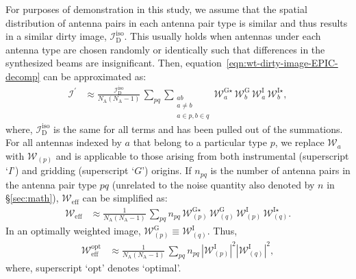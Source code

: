 \documentclass[a4paper,fleqn,usenatbib]{mnras}
\newcommand{\Nant}{N_\textrm{A}}
\begin{document}
For purposes of demonstration in this study, we assume that the spatial distribution of antenna pairs in each antenna pair type is similar and thus results in a similar dirty image, $\mathcal{I}_\textrm{D}^\textrm{iso}$. This usually holds when antennas under each antenna type are chosen randomly or identically such that differences in the synthesized beams are insignificant. Then, equation~\ref{eqn:wt-dirty-image-EPIC-decomp} can be approximated as:
\begin{align}\label{eqn:wt-dirty-image-EPIC-decomp-approx1}
  \mathcal{I}^\prime &\approx \frac{\mathcal{I}_\textrm{D}^\textrm{iso}}{\Nant(\Nant-1)}\,\sum_{pq}\sum_{\substack{ab\\a\ne b\\a\in p, b\in q}} \mathcal{W}^{\textrm{G}\star}_a\,\mathcal{W}^\textrm{G}_b\,\mathcal{W}^\textrm{I}_a\,\mathcal{W}^{\textrm{I}\star}_b,
\end{align}
where, $\mathcal{I}_\textrm{D}^\textrm{iso}$ is the same for all terms and has been pulled out of the summations. For all antennas indexed by $a$ that belong to a particular type $p$, we replace $\mathcal{W}_a$ with $\mathcal{W}_{(p)}$ and is applicable to those arising from both instrumental (superscript `$I$') and gridding (superscript `$G$') origins. If $n_{pq}$ is the number of antenna pairs in the antenna pair type $pq$ (unrelated to the noise quantity also denoted by $n$ in \S\ref{sec:math}), $\mathcal{W}_\textrm{eff}$ can be simplified as:
\begin{align}\label{eqn:wt-dirty-image-EPIC-decomp-approx2}
  \mathcal{W}_\textrm{eff} &\approx \frac{1}{\Nant(\Nant-1)}\,\sum_{pq}n_{pq}\,\mathcal{W}^{\textrm{G}\star}_{(p)}\,\mathcal{W}^\textrm{G}_{(q)}\,\mathcal{W}^\textrm{I}_{(p)}\,\mathcal{W}^{\textrm{I}\star}_{(q)}.
\end{align}
In an optimally weighted image, $\mathcal{W}^\textrm{G}_{(p)} \equiv \mathcal{W}^\textrm{I}_{(q)}$. Thus,
\begin{align}\label{eqn:effective-weighting-optimal}
  \mathcal{W}_\textrm{eff}^\textrm{opt} &\approx \frac{1}{\Nant(\Nant-1)}\,\sum_{pq} n_{pq}\,\left|\mathcal{W}^\textrm{I}_{(p)}\right|^2\left|\mathcal{W}^\textrm{I}_{(q)}\right|^2,
\end{align}
where, superscript `$\textrm{opt}$' denotes `optimal'.
\end{document}
